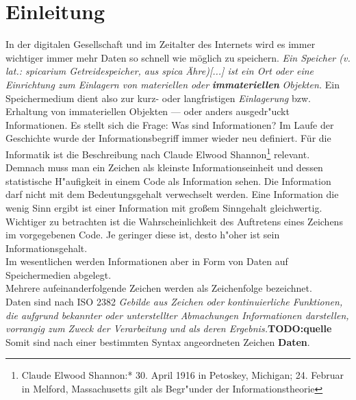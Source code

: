 
\chapter{Einleitung}
\label{ch:Einleitung}

In der digitalen Gesellschaft und im Zeitalter des Internets wird es immer wichtiger immer mehr Daten so schnell wie möglich zu speichern.  \textit{Ein Speicher (v. lat.: spicarium Getreidespeicher, aus spica Ähre)[...] ist ein Ort oder eine Einrichtung zum Einlagern von materiellen oder} \textbf{\textit{immateriellen}} \textit{Objekten.}\cite{wiki:Speicher}
\newline
Ein Speichermedium dient also zur kurz- oder langfristigen \glqq \textit{Einlagerung}\grqq{} bzw. \mbox{Erhaltung} von immateriellen Objekten --- oder anders ausgedr"uckt Informationen. 
Es stellt sich die Frage: Was sind Informationen? \newline
Im Laufe der Geschichte wurde der Informationsbegriff immer wieder neu definiert. Für die Informatik ist die Beschreibung nach Claude Elwood Shannon\footnote{Claude Elwood Shannon:* 30. April 1916 in Petoskey, Michigan; \textdagger{} 24. Februar in Melford, Massachusetts gilt als Begr"under der Informationstheorie} relevant. Demnach muss man ein Zeichen als kleinste Informationseinheit und dessen \mbox{statistische} H"aufigkeit in einem Code als Information sehen. 
\newline
Die Information darf nicht mit dem Bedeutungsgehalt verwechselt werden. Eine Information die wenig Sinn ergibt ist einer Information mit großem Sinngehalt gleichwertig. Wichtiger zu betrachten ist die Wahrscheinlichkeit des Auftretens eines Zeichens im vorgegebenen Code. Je geringer diese ist, desto h"oher ist sein \mbox{Informationsgehalt}.
\\
Im wesentlichen werden Informationen aber in Form von Daten auf Speichermedien abgelegt. 
\\Mehrere aufeinanderfolgende Zeichen werden als Zeichenfolge bezeichnet.\cite{hansen:wi1}
\\ 
Daten sind nach ISO 2382 
\glqq \textit{Gebilde aus Zeichen oder kontinuierliche Funktionen, die aufgrund bekannter oder unterstellter Abmachungen Informationen darstellen, vorrangig zum Zweck der Verarbeitung und als deren Ergebnis.}\grqq{}\textbf{TODO:quelle} 
\\
Somit sind nach einer bestimmten Syntax angeordneten Zeichen \textbf{Daten}.

